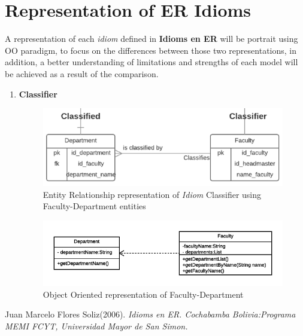 \documentclass{article}
\begin{document}
\section{Representation of ER Idioms}
A representation of each \textit{idiom} defined in \textbf{Idioms en ER}\cite{ER_Idioms}
will be portrait using OO paradigm, to focus on the differences between those
two representations, in addition, a better understanding of limitations and strengths
of each model will be achieved as a result of the comparison.

\begin{enumerate}
	\item \textbf{Classifier}
	      \begin{figure}[H]
	      	\centering
	      	\includegraphics[width=14cm]{classifier}
	      	\caption{Entity Relationship representation of \textit{Idiom} Classifier
	      	using Faculty-Department entities }
	      \end{figure}
	      \begin{figure}[H]
	      	\centering
	      	\includegraphics{ooumlclassifier}
	      	\caption{Object Oriented representation of Faculty-Department}
	      \end{figure}
\end{enumerate}

\medskip
\begin{thebibliography}{9}
	Juan Marcelo Flores Soliz(2006).
	\textit{Idioms en ER. Cochabamba Bolivia:Programa MEMI FCYT, Universidad Mayor de San Simon.}
\end{thebibliography}
\end{document}
